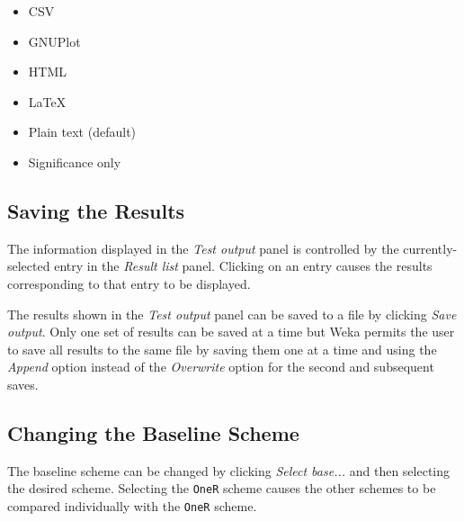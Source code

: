 \begin{itemize}
   \item CSV
   \item GNUPlot
   \item HTML
   \item LaTeX
   \item Plain text (default)
   \item Significance only 
\end{itemize}

\begin{center}
\end{center}


\subsection{Saving the Results}

The information displayed in the \textit{Test output} panel is controlled by the currently-selected entry in the \textit{Result list} panel. Clicking on an entry causes the results corresponding to that entry to be displayed.
\begin{center}
\end{center}

The results shown in the \textit{Test output} panel can be saved to a file by clicking \textit{Save output}. Only one set of results can be saved at a time but Weka permits the user to save all results to the same file by saving them one at a time and using the \textit{Append} option instead of the \textit{Overwrite} option for the second and subsequent saves.
\begin{center}
\end{center}


\subsection{Changing the Baseline Scheme}

The baseline scheme can be changed by clicking \textit{Select base...} and then selecting the desired scheme. Selecting the \texttt{OneR} scheme causes the other schemes to be compared individually with the \texttt{OneR} scheme.
\begin{center}
\end{center}

